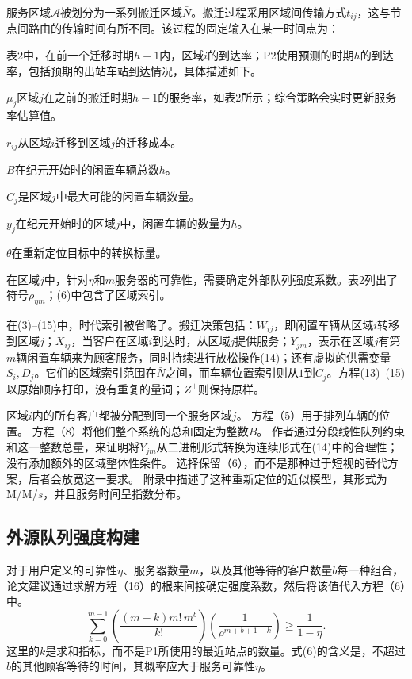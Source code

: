 \documentclass{article}
\begin{document}
服务区域$\mathcal A$被划分为一系列搬迁区域$\bar N$。搬迁过程采用区域间传输方式$t_{ij}$，这与节点间路由的传输时间有所不同。该过程的固定输入在某一时间点为：
\begin{description}
\item[$\lambda_i$] 表2中，在前一个迁移时期$h-1$内，区域$i$的到达率；P2使用预测的时期$h$的到达率，包括预期的出站车站到达情况，具体描述如下。
\item$\mu_j$区域$j$在之前的搬迁时期$h-1$的服务率，如表2所示；综合策略会实时更新服务率估算值。
\item$r_{ij}$从区域$i$迁移到区域$j$的迁移成本。
\item$B$在纪元开始时的闲置车辆总数$h$。
\item$C_j$是区域$j$中最大可能的闲置车辆数量。
\item$y_j$在纪元开始时的区域$j$中，闲置车辆的数量为$h$。
\item$\theta$在重新定位目标中的转换标量。
\item[$\rho_{\eta jm}$] 在区域$j$中，针对$\eta$和$m$服务器的可靠性，需要确定外部队列强度系数。表2列出了符号$\rho_{\eta m}$；(6)中包含了区域索引。
\end{description}
在(3)--(15)中，时代索引被省略了。搬迁决策包括：$W_{ij}$，即闲置车辆从区域$i$转移到区域$j$；$X_{ij}$，当客户在区域$i$到达时，从区域$j$提供服务；$Y_{jm}$，表示在区域$j$有第$m$辆闲置车辆来为顾客服务，同时持续进行放松操作(14)；还有虚拟的供需变量$S_i,D_j$。它们的区域索引范围在$\bar N$之间，而车辆位置索引则从$1$到$C_j$。方程(13)--(15)以原始顺序打印，没有重复的量词；$Z^+$则保持原样。

区域$i$内的所有客户都被分配到同一个服务区域$j$。 方程（5）用于排列车辆的位置。 方程（8）将他们整个系统的总和固定为整数$B$。 作者通过分段线性队列约束和这一整数总量，来证明将$Y_{jm}$从二进制形式转换为连续形式在(14)中的合理性；没有添加额外的区域整体性条件。 选择保留（6），而不是那种过于短视的替代方案，后者会放宽这一要求。 附录中描述了这种重新定位的近似模型，其形式为 M/M/$s$，并且服务时间呈指数分布。

\subsection*{外源队列强度构建}
对于用户定义的可靠性$\eta$、服务器数量$m$，以及其他等待的客户数量$b$每一种组合，论文建议通过求解方程（16）的根来间接确定强度系数，然后将该值代入方程（6）中。
\begin{equation}
\sum_{k=0}^{m-1}
\left(\frac{(m-k)m!\,m^b}{k!}\right)
\left(\frac{1}{\rho^{m+b+1-k}}\right)
\geq\frac{1}{1-\eta}.\tag{16}
\end{equation}
这里的$k$是求和指标，而不是P1所使用的最近站点的数量。式(6)的含义是，不超过$b$的其他顾客等待的时间，其概率应大于服务可靠性$\eta$。
\end{document}
